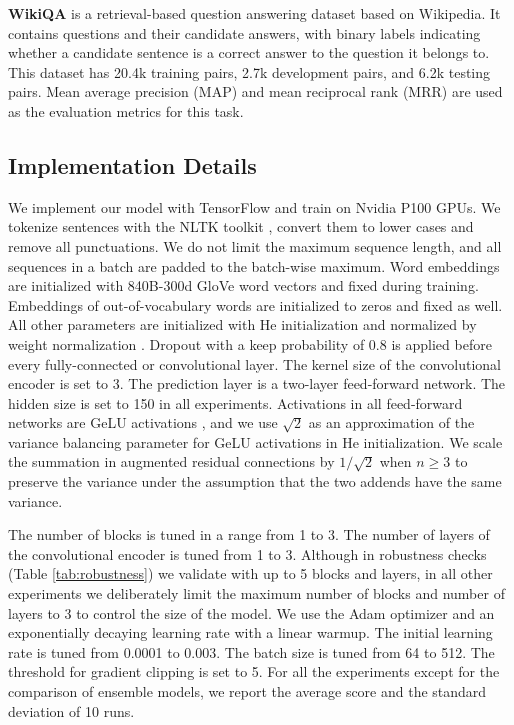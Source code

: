 \documentclass[11pt,a4paper]{article}
\begin{document}
{\bf WikiQA} \cite{wikiqa} is a retrieval-based question answering dataset based on Wikipedia. It contains questions and their candidate answers, with binary labels indicating whether a candidate sentence is a correct answer to the question it belongs to. This dataset has 20.4k training pairs, 2.7k development pairs, and 6.2k testing pairs. Mean average precision (MAP) and mean reciprocal rank (MRR) are used as the evaluation metrics for this task.

\subsection{Implementation Details}
We implement our model with TensorFlow \cite{abadi2016tensorflow} and train on Nvidia P100 GPUs. We tokenize sentences with the NLTK toolkit \cite{bird2009natural}, convert them to lower cases and remove all punctuations. We do not limit the maximum sequence length, and all sequences in a batch are padded to the batch-wise maximum.
Word embeddings are initialized with 840B-300d GloVe word vectors \cite{pennington2014glove} and fixed during training. Embeddings of out-of-vocabulary words are initialized to zeros and fixed as well. All other parameters are initialized with He initialization \cite{he2015delving} and normalized by weight normalization \cite{salimans2016weight}. 
Dropout with a keep probability of 0.8 is applied before every fully-connected or convolutional layer. The kernel size of the convolutional encoder is set to 3. The prediction layer is a two-layer feed-forward network. The hidden size is set to 150 in all experiments. Activations in all feed-forward networks are GeLU activations \cite{hendrycks2016bridging}, and we use $\sqrt{2}$ as an approximation of the variance balancing parameter for GeLU activations in He initialization. We scale the summation in augmented residual connections by $1/\sqrt{2}$ when $n \geq 3$ to preserve the variance under the assumption that the two addends have the same variance.

The number of blocks is tuned in a range from 1 to 3. The number of layers of the convolutional encoder is tuned from 1 to 3. Although in robustness checks (Table \ref{tab:robustness}) we validate with up to 5 blocks and layers, in all other experiments we deliberately limit the maximum number of blocks and number of layers to 3 to control the size of the model. We use the Adam optimizer \cite{kingma2015adam} and an exponentially decaying learning rate with a linear warmup. The initial learning rate is tuned from 0.0001 to 0.003. The batch size is tuned from 64 to 512. The threshold for gradient clipping is set to 5. For all the experiments except for the comparison of ensemble models, we report the average score and the standard deviation of 10 runs.
\end{document}
